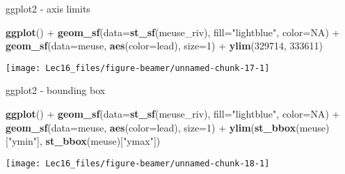 \documentclass[11pt,ignorenonframetext,]{beamer}
\newenvironment{Shaded}{}{}
\newcommand{\DataTypeTok}[1]{\textcolor[rgb]{0.56,0.13,0.00}{#1}}
\newcommand{\DecValTok}[1]{\textcolor[rgb]{0.25,0.63,0.44}{#1}}
\newcommand{\KeywordTok}[1]{\textcolor[rgb]{0.00,0.44,0.13}{\textbf{#1}}}
\newcommand{\NormalTok}[1]{#1}
\newcommand{\OperatorTok}[1]{\textcolor[rgb]{0.40,0.40,0.40}{#1}}
\newcommand{\OtherTok}[1]{\textcolor[rgb]{0.00,0.44,0.13}{#1}}
\newcommand{\StringTok}[1]{\textcolor[rgb]{0.25,0.44,0.63}{#1}}
\let\oldShaded\Shaded
\let\endoldShaded\endShaded
\renewenvironment{Shaded}{\footnotesize\begin{spacing}{0.9}\oldShaded}{\endoldShaded\end{spacing}}
\let\oldverbatim\verbatim
\let\endoldverbatim\endverbatim
\newcommand{\scriptoutput}{
  \renewenvironment{Shaded}{\scriptsize\begin{spacing}{0.9}\oldShaded}{\endoldShaded\end{spacing}}
  \renewenvironment{verbatim}{\scriptsize\begin{spacing}{0.9}\oldverbatim}{\endoldverbatim\end{spacing}}
}
\begin{document}
\begin{frame}[fragile,t]{ggplot2 - axis limits}
\protect\hypertarget{ggplot2---axis-limits-1}{}

\scriptoutput

\begin{Shaded}
\begin{Highlighting}[]
\KeywordTok{ggplot}\NormalTok{() }\OperatorTok{+}
\StringTok{  }\KeywordTok{geom_sf}\NormalTok{(}\DataTypeTok{data=}\KeywordTok{st_sf}\NormalTok{(meuse_riv), }\DataTypeTok{fill=}\StringTok{"lightblue"}\NormalTok{, }\DataTypeTok{color=}\OtherTok{NA}\NormalTok{) }\OperatorTok{+}
\StringTok{  }\KeywordTok{geom_sf}\NormalTok{(}\DataTypeTok{data=}\NormalTok{meuse, }\KeywordTok{aes}\NormalTok{(}\DataTypeTok{color=}\NormalTok{lead), }\DataTypeTok{size=}\DecValTok{1}\NormalTok{) }\OperatorTok{+}
\StringTok{  }\KeywordTok{ylim}\NormalTok{(}\DecValTok{329714}\NormalTok{, }\DecValTok{333611}\NormalTok{)}
\end{Highlighting}
\end{Shaded}

\begin{center}\texttt{[image: Lec16\_files/figure-beamer/unnamed-chunk-17-1]} \end{center}

\end{frame}

\begin{frame}[fragile,t]{ggplot2 - bounding box}
\protect\hypertarget{ggplot2---bounding-box}{}

\scriptoutput

\begin{Shaded}
\begin{Highlighting}[]
\KeywordTok{ggplot}\NormalTok{() }\OperatorTok{+}
\StringTok{  }\KeywordTok{geom_sf}\NormalTok{(}\DataTypeTok{data=}\KeywordTok{st_sf}\NormalTok{(meuse_riv), }\DataTypeTok{fill=}\StringTok{"lightblue"}\NormalTok{, }\DataTypeTok{color=}\OtherTok{NA}\NormalTok{) }\OperatorTok{+}
\StringTok{  }\KeywordTok{geom_sf}\NormalTok{(}\DataTypeTok{data=}\NormalTok{meuse, }\KeywordTok{aes}\NormalTok{(}\DataTypeTok{color=}\NormalTok{lead), }\DataTypeTok{size=}\DecValTok{1}\NormalTok{) }\OperatorTok{+}
\StringTok{  }\KeywordTok{ylim}\NormalTok{(}\KeywordTok{st_bbox}\NormalTok{(meuse)[}\StringTok{"ymin"}\NormalTok{], }\KeywordTok{st_bbox}\NormalTok{(meuse)[}\StringTok{"ymax"}\NormalTok{])}
\end{Highlighting}
\end{Shaded}

\begin{center}\texttt{[image: Lec16\_files/figure-beamer/unnamed-chunk-18-1]} \end{center}

\end{frame}
\end{document}
